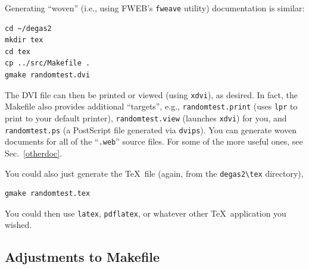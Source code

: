 \documentclass[12pt]{report}
\begin{document}
Generating ``woven'' (i.e., using FWEB's {\tt fweave} utility)  
documentation is similar:
\begin{verbatim}
cd ~/degas2
mkdir tex
cd tex
cp ../src/Makefile .
gmake randomtest.dvi
\end{verbatim}
The DVI file can then be printed or viewed (using {\tt xdvi}), as desired.
In fact, the Makefile also provides additional ``targets'', e.g.,
{\tt randomtest.print} (uses {\tt lpr} to print to your default printer),
{\tt randomtest.view} (launches {\tt xdvi}) for you, and
{\tt randomtest.ps} (a PostScript file generated via {\tt dvips}). You
can generate woven documents for all of the ``{\tt .web}'' source files.
For some of the more useful ones, see Sec.~\ref{otherdoc}.

You could also just generate the \TeX\ file (again, from the \verb+degas2\tex+
directory),
\begin{verbatim}
gmake randomtest.tex
\end{verbatim}
You could then use {\tt latex}, {\tt pdflatex}, or whatever other \TeX\ application
you wished. 

\subsection{Adjustments to Makefile}
\label{adjustments}
\end{document}
